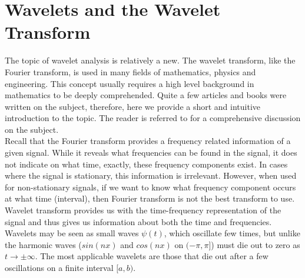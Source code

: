 %

\chapter{Wavelets and the Wavelet Transform}
\label{app:wavelets}

The topic of wavelet analysis is relatively a new. The wavelet transform, like the Fourier transform, is used in many fields of mathematics, physics and engineering. This concept usually requires a high level background in mathematics to be deeply comprehended. Quite a few articles and books were written on the subject, therefore, here we provide a short and intuitive introduction to the topic. The reader is referred to \cite{meyer1992wavelets} for a comprehensive discussion on the subject.\\ 

Recall that the Fourier transform provides a frequency related information of a given signal. While it reveals what frequencies can be found in the signal, it does not indicate on what time, exactly, these frequency components exist. In cases where the signal is stationary, this information is irrelevant. However, when used for non-stationary signals, if we want to know what frequency component occurs at what time (interval), then Fourier transform is not the best transform to use. Wavelet transform provides us with the time-frequency representation of the signal and thus gives us information about both the time and frequencies.\\

Wavelets may be seen as small waves $\psi(t)$, which oscillate few times, but unlike the harmonic waves ($sin(nx)$ and $cos(nx)$ on $(-\pi,\pi]$) must die out to zero as $t \rightarrow \pm\infty$. The most applicable wavelets are those that die out after a few oscillations on a finite interval $[a,b)$. \\

